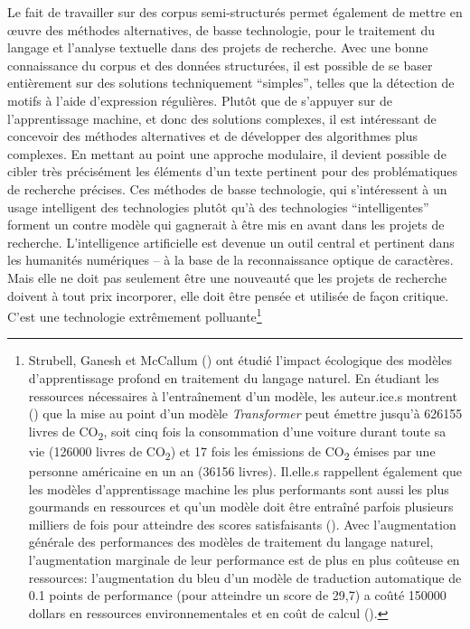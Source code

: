 Le fait de travailler sur des corpus semi-structurés permet également de mettre en œuvre des méthodes alternatives, de basse technologie, pour le traitement du langage et l'analyse textuelle dans des projets de recherche. Avec une bonne connaissance du corpus et des données structurées, il est possible de se baser entièrement sur des solutions techniquement \enquote{simples}, telles que la détection de motifs à l'aide d'\glspl{expression régulière}. Plutôt que de s'appuyer sur de l'apprentissage machine, et donc des solutions complexes, il est intéressant de concevoir des méthodes alternatives et de développer des algorithmes plus complexes. En mettant au point une approche modulaire, il devient possible de cibler très précisément les éléments d'un texte pertinent pour des problématiques de recherche précises. Ces méthodes de basse technologie, qui s'intéressent à un usage intelligent des technologies plutôt qu'à des technologies \enquote{intelligentes} forment un contre modèle qui gagnerait à être mis en avant dans les projets de recherche. L'intelligence artificielle est devenue un outil central et pertinent dans les humanités numériques -- à la base de la reconnaissance optique de caractères. Mais elle ne doit pas seulement être une nouveauté que les projets de recherche doivent à tout prix incorporer, elle doit être pensée et utilisée de façon critique. C'est une technologie extrêmement polluante\footnote{
	Strubell, Ganesh et McCallum (\cite{strubell_energy_2019}) ont étudié l'impact écologique des modèles d'apprentissage profond en traitement du langage naturel. En étudiant les ressources nécessaires à l'entraînement d'un modèle, les auteur.ice.s montrent (\cite[p. 1]{strubell_energy_2019}) que la mise au point d'un modèle \textit{Transformer} peut émettre jusqu'à 626155 livres de CO\textsubscript{2}, soit cinq fois la consommation d'une voiture durant toute sa vie (126000 livres de CO\textsubscript{2}) et 17 fois les émissions de CO\textsubscript{2} émises par une personne américaine en un an (36156 livres). Il.elle.s rappellent également que les modèles d'apprentissage machine les plus performants sont aussi les plus gourmands en ressources et qu'un modèle doit être entraîné parfois plusieurs milliers de fois pour atteindre des scores satisfaisants (\cite[p. 1]{strubell_energy_2019}). Avec l'augmentation générale des performances des modèles de traitement du langage naturel, l'augmentation marginale de leur performance est de plus en plus coûteuse en ressources: l'augmentation du \gls{bleu} d'un modèle de traduction automatique de 0.1 points de performance (pour atteindre un score de 29,7) a coûté 150000 dollars en ressources environnementales et en coût de calcul (\cite[p. 4]{strubell_energy_2019}).
}
